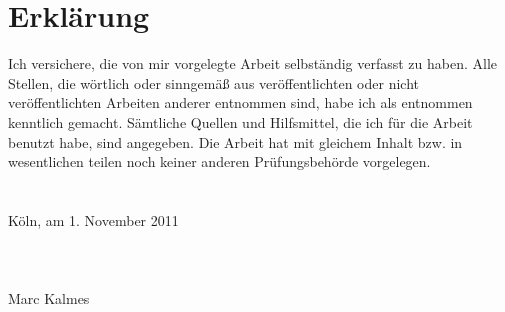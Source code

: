 \mainmatter



%

\backmatter
\appendix


\printbibliography[]

\chapter*{Erklärung}
Ich versichere, die von mir vorgelegte Arbeit selbständig verfasst zu haben. Alle Stellen, die wörtlich oder sinngemäß
 aus veröffentlichten oder nicht veröffentlichten Arbeiten anderer entnommen sind, habe ich als entnommen kenntlich
 gemacht. Sämtliche Quellen und Hilfsmittel, die ich für die Arbeit benutzt habe, sind angegeben. Die Arbeit hat mit
 gleichem Inhalt bzw. in wesentlichen teilen noch keiner anderen Prüfungsbehörde vorgelegen.
\\
\\
\\
Köln, am 1. November 2011
\\
\\
\\
\\
Marc Kalmes

\thispagestyle{empty}
\cleardoublepage

